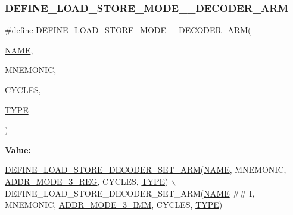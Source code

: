 \subsubsection{\texorpdfstring{D\+E\+F\+I\+N\+E\+\_\+\+L\+O\+A\+D\+\_\+\+S\+T\+O\+R\+E\+\_\+\+M\+O\+D\+E\+\_\+\_\+\+D\+E\+C\+O\+D\+E\+R\+\_\+\+A\+RM}{DEFINE\_LOAD\_STORE\_MODE\_3\_DECODER\_ARM}}
{\footnotesize\ttfamily \#define D\+E\+F\+I\+N\+E\+\_\+\+L\+O\+A\+D\+\_\+\+S\+T\+O\+R\+E\+\_\+\+M\+O\+D\+E\+\_\+\_\+\+D\+E\+C\+O\+D\+E\+R\+\_\+\+A\+RM(\begin{DoxyParamCaption}\item[{}]{\mbox{\hyperlink{inflate_8h_a164ea0159d5f0b5f12a646f25f99eceaa67bc2ced260a8e43805d2480a785d312}{N\+A\+ME}},  }\item[{}]{M\+N\+E\+M\+O\+N\+IC,  }\item[{}]{C\+Y\+C\+L\+ES,  }\item[{}]{\mbox{\hyperlink{inflate_8h_a164ea0159d5f0b5f12a646f25f99eceaab47ea8bb955afd0adc0ef98517dd6084}{T\+Y\+PE}} }\end{DoxyParamCaption})}

{\bfseries Value\+:}
\begin{DoxyCode}
\mbox{\hyperlink{decoder-arm_8c_ab31bf408eb3c9556d621cfa92cfcda18}{DEFINE\_LOAD\_STORE\_DECODER\_SET\_ARM}}(\mbox{\hyperlink{inflate_8h_a164ea0159d5f0b5f12a646f25f99eceaa67bc2ced260a8e43805d2480a785d312}{NAME}}, MNEMONIC, 
      \mbox{\hyperlink{decoder-arm_8c_a20938819535c2aad9bcabce8d0cd392e}{ADDR\_MODE\_3\_REG}}, CYCLES, \mbox{\hyperlink{inflate9_8h_a164ea0159d5f0b5f12a646f25f99eceaab47ea8bb955afd0adc0ef98517dd6084}{TYPE}}) \(\backslash\)
    DEFINE\_LOAD\_STORE\_DECODER\_SET\_ARM(\mbox{\hyperlink{inflate_8h_a164ea0159d5f0b5f12a646f25f99eceaa67bc2ced260a8e43805d2480a785d312}{NAME}} ## I, MNEMONIC, \mbox{\hyperlink{decoder-arm_8c_a321c7a001ccca870aa3fa7f2e50835ec}{ADDR\_MODE\_3\_IMM}}, CYCLES, 
      \mbox{\hyperlink{inflate9_8h_a164ea0159d5f0b5f12a646f25f99eceaab47ea8bb955afd0adc0ef98517dd6084}{TYPE}})
\end{DoxyCode}
\mbox{\label{decoder-arm_8c_a0675663335afa1ce371d54f3a36028dc}} 
